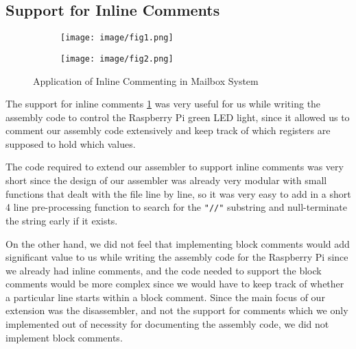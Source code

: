 \documentclass{article}
\begin{document}
        
        \begin{adjustwidth}{2em}{0pt}
    
        \subsection{Support for Inline Comments}
        
            \begin{figure}[h]
                \centering
                \begin{subfigure}{0.45\linewidth}
                    \centering
                    \texttt{[image: image/fig1.png]} 
                \end{subfigure}
                \begin{subfigure}{0.45\linewidth}
                    \centering
                    \texttt{[image: image/fig2.png]}
                \end{subfigure}
                \caption{Application of Inline Commenting in Mailbox System}
                \label{fig:commenting}
            \end{figure}
        
            The support for inline comments \ref{fig:commenting} was very useful for us while writing the assembly code to control the Raspberry Pi green LED light, since it allowed us to comment our assembly code extensively and keep track of which registers are supposed to hold which values. 
            
            The code required to extend our assembler to support inline comments was very short since the design of our assembler was already very modular with small functions that dealt with the file line by line, so it was very easy to add in a short 4 line pre-processing function to search for the \texttt{"//"} substring and null-terminate the string early if it exists. 
            
            On the other hand, we did not feel that implementing block comments would add significant value to us while writing the assembly code for the Raspberry Pi since we already had inline comments, and the code needed to support the block comments would be more complex since we would have to keep track of whether a particular line starts within a block comment. Since the main focus of our extension was the disassembler, and not the support for comments which we only implemented out of necessity for documenting the assembly code, we did not implement block comments.
        

\end{adjustwidth}
\end{document}

